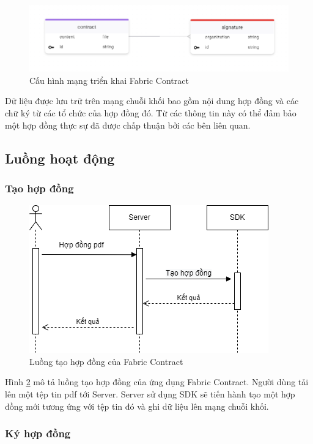 \documentclass[../DoAn.tex]{subfiles}
\begin{document}
\begin{figure}[H]
    \centering
    \includegraphics[width=0.75\linewidth]{Hinhve/DoAn-ContractAppDappConfig.png}
    \caption{Cấu hình mạng triển khai Fabric Contract}
    \label{fig:ContractAppDappConfig}
\end{figure}

Dữ liệu được lưu trữ trên mạng chuỗi khối bao gồm nội dung hợp đồng và các chữ
ký từ các tổ chức của hợp đồng đó. Từ các thông tin này có thể đảm bảo một hợp
đồng thực sự đã được chấp thuận bởi các bên liên quan.

\subsection{Luồng hoạt động}

\subsubsection{Tạo hợp đồng}

\begin{figure}[H]
    \centering
    \includegraphics[width=0.75\linewidth]{Hinhve/DoAn-SeqCreateContract.drawio.png}
    \caption{Luồng tạo hợp đồng của Fabric Contract}
    \label{fig:SeqCreateContract}
\end{figure}

Hình \ref{fig:SeqCreateContract} mô tả luồng tạo hợp đồng của ứng dụng Fabric
Contract. Người dùng tải lên một tệp tin pdf tới Server. Server sử dụng SDK sẽ
tiến hành tạo một hợp đồng mới tương ứng với tệp tin đó và ghi dữ liệu lên mạng
chuỗi khối.

\subsubsection{Ký hợp đồng}
\end{document}
